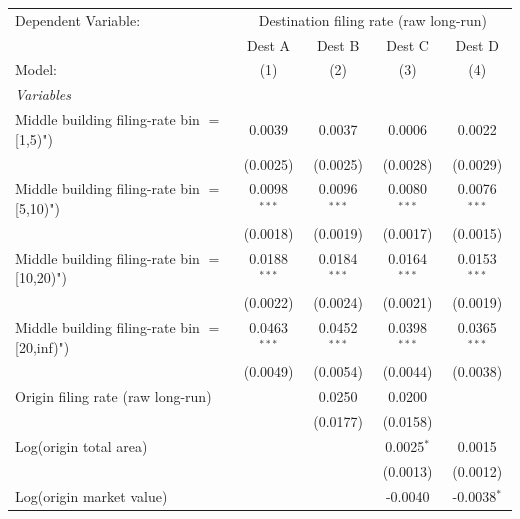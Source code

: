 \begingroup
\centering
\begin{tabular}{lcccc}
   \tabularnewline \midrule \midrule
   Dependent Variable: & \multicolumn{4}{c}{Destination filing rate (raw long-run)}\\
                                                  & Dest A         & Dest B         & Dest C         & Dest D \\   
   Model:                                         & (1)            & (2)            & (3)            & (4)\\  
   \midrule
   \emph{Variables}\\
   Middle building filing-rate bin $=$ [1,5)")    & 0.0039         & 0.0037         & 0.0006         & 0.0022\\   
                                                  & (0.0025)       & (0.0025)       & (0.0028)       & (0.0029)\\   
   Middle building filing-rate bin $=$ [5,10)")   & 0.0098$^{***}$ & 0.0096$^{***}$ & 0.0080$^{***}$ & 0.0076$^{***}$\\   
                                                  & (0.0018)       & (0.0019)       & (0.0017)       & (0.0015)\\   
   Middle building filing-rate bin $=$ [10,20)")  & 0.0188$^{***}$ & 0.0184$^{***}$ & 0.0164$^{***}$ & 0.0153$^{***}$\\   
                                                  & (0.0022)       & (0.0024)       & (0.0021)       & (0.0019)\\   
   Middle building filing-rate bin $=$ [20,inf)") & 0.0463$^{***}$ & 0.0452$^{***}$ & 0.0398$^{***}$ & 0.0365$^{***}$\\   
                                                  & (0.0049)       & (0.0054)       & (0.0044)       & (0.0038)\\   
   Origin filing rate (raw long-run)              &                & 0.0250         & 0.0200         &   \\   
                                                  &                & (0.0177)       & (0.0158)       &   \\   
   Log(origin total area)                         &                &                & 0.0025$^{*}$   & 0.0015\\   
                                                  &                &                & (0.0013)       & (0.0012)\\   
   Log(origin market value)                       &                &                & -0.0040        & -0.0038$^{*}$\\   

\end{tabular}
